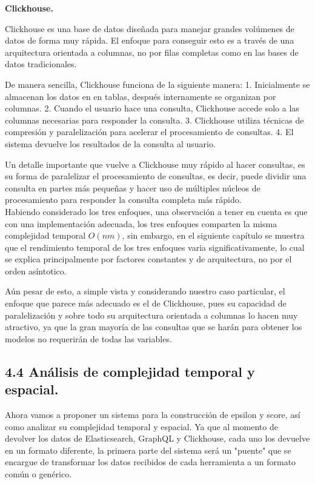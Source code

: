 \documentclass[
 12pt,
 letterpaper,
]{article}
\theoremstyle{teoremaBreak}
\theoremstyle{plain}
\theoremstyle{definition}
\begin{document}
\textbf{Clickhouse.}

Clickhouse es una base de datos diseñada para manejar grandes volúmenes de datos de forma muy rápida. El enfoque 
para conseguir esto es a través de una arquitectura orientada a columnas, no por filas completas como en las bases 
de datos tradicionales. 

De manera sencilla, Clickhouse funciona de la siguiente manera:
1. Inicialmente se almacenan los datos en en tablas, después internamente se organizan por columnas.
2. Cuando el usuario hace una consulta, Clickhouse accede solo a las columnas necesarias para responder la consulta.
3. Clickhouse utiliza técnicas de compresión y paralelización para acelerar el procesamiento de consultas.
4. El sistema devuelve los resultados de la consulta al usuario.

Un detalle importante que vuelve a Clickhouse muy rápido al hacer consultas, es su forma de paralelizar el procesamiento 
de consultas, es decir, puede dividir una consulta en partes más pequeñas y hacer uso de múltiples núcleos de 
procesamiento para responder la consulta completa más rápido.\\

Habiendo considerado los tres enfoques, una observación a tener en cuenta es que con una implementación adecuada, 
los tres enfoques comparten la misma complejidad temporal $O(nm)$, 
sin embargo, en el siguiente capítulo se muestra que el rendimiento temporal de los tres enfoques varia significativamente, 
lo cual se explica principalmente por factores constantes y de arquitectura, no por el orden asíntotico.

Aún pesar de esto, a simple vista y considerando nuestro caso particular, el enfoque que parece más adecuado es el de Clickhouse, 
pues su capacidad de paralelización y sobre todo su arquitectura orientada a columnas lo hacen muy atractivo, ya que 
la gran mayoría de las consultas que se harán para obtener los modelos no requerirán de todas las variables. 

\subsection{4.4 Análisis de complejidad temporal y espacial.}\label{4.4-análisis-de-complejidad-temporal-y-espacial.}

Ahora vamos a proponer un sistema para la construcción de epsilon y score, así como analizar su complejidad temporal y 
espacial.
Ya que al momento de devolver los datos de Elasticsearch, GraphQL y Clickhouse, cada uno los devuelve en un 
formato diferente, la primera parte del sistema será un "puente" que se encargue de transformar los datos 
recibidos de cada herramienta a un formato común o genérico. 
\end{document}
